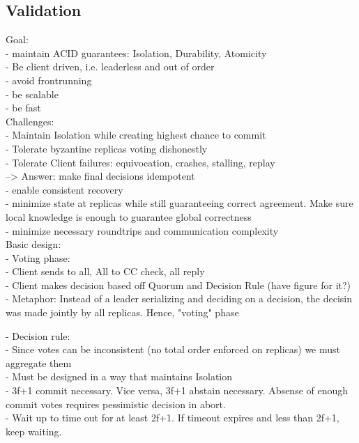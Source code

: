 \subsection{Validation}
Goal:\\
- maintain ACID guarantees: Isolation, Durability, Atomicity\\
- Be client driven, i.e. leaderless and out of order\\
- avoid frontrunning\\
- be scalable\\
- be fast\\


Challenges:\\
- Maintain Isolation while creating highest chance to commit\\
- Tolerate byzantine replicas voting dishonestly\\
- Tolerate Client failures: equivocation, crashes, stalling, replay\\
--> Answer: make final decisions idempotent\\
- enable consistent recovery\\
- minimize state at replicas while still guaranteeing correct agreement. Make sure local knowledge is enough to guarantee global correctness\\
- minimize necessary roundtrips and communication complexity\\


Basic design:\\
- Voting phase:\\
	- Client sends to all, All to CC check, all reply\\
	- Client makes decision based off Quorum and Decision Rule (have figure for it?)\\
	- Metaphor: Instead of a leader serializing and deciding on a decision, the decisin was made jointly by all replicas. Hence, "voting" phase
	
- Decision rule:\\
	- Since votes can be inconsistent (no total order enforced on replicas) we must aggregate them\\
	- Must be designed in a way that maintains Isolation\\
	- 3f+1 commit necessary. Vice versa, 3f+1 abstain necessary. Absense of enough commit votes requires pessimistic decision in abort.\\
	- Wait up to time out for at least 2f+1. If timeout expires and less than 2f+1, keep waiting. \\
	
